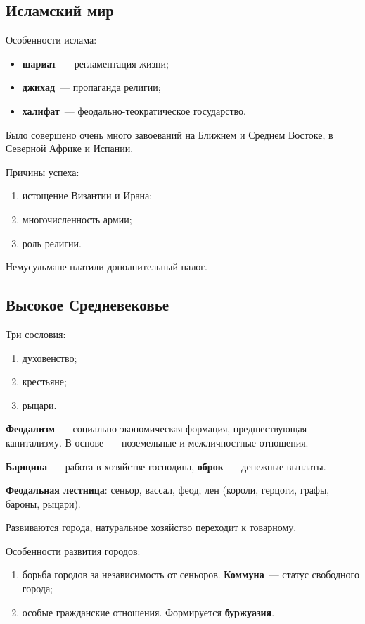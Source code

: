 \documentclass[a4paper, 12pt]{article}
\begin{document}
\subsection{Исламский мир}
Особенности ислама:
\begin{itemize}[noitemsep]
  \item \textbf{шариат}~--- регламентация жизни;
  \item \textbf{джихад}~--- пропаганда религии;
  \item \textbf{халифат}~--- феодально-теократическое государство.
\end{itemize}

Было совершено очень много завоеваний на Ближнем и Среднем Востоке,
в Северной Африке и Испании.

Причины успеха:
\begin{enumerate}[noitemsep]
  \item истощение Византии и Ирана;
  \item многочисленность армии;
  \item роль религии.
\end{enumerate}

Немусульмане платили дополнительный налог.

\subsection{Высокое Средневековье}
Три сословия:
\begin{enumerate}[noitemsep]
  \item духовенство;
  \item крестьяне;
  \item рыцари.
\end{enumerate}

\textbf{Феодализм}~--- социально-экономическая формация, предшествующая
капитализму. В основе~--- поземельные и межличностные отношения.

\textbf{Барщина}~--- работа в хозяйстве господина, \textbf{оброк}~---
денежные выплаты.

\textbf{Феодальная лестница}: сеньор, вассал, феод, лен (короли, герцоги,
графы, бароны, рыцари).

Развиваются города, натуральное хозяйство переходит к товарному.

Особенности развития городов:
\begin{enumerate}[noitemsep]
  \item борьба городов за независимость от сеньоров. \textbf{Коммуна}~---
  статус свободного города;
  \item особые гражданские отношения. Формируется \textbf{буржуазия}.
\end{enumerate}
\end{document}
